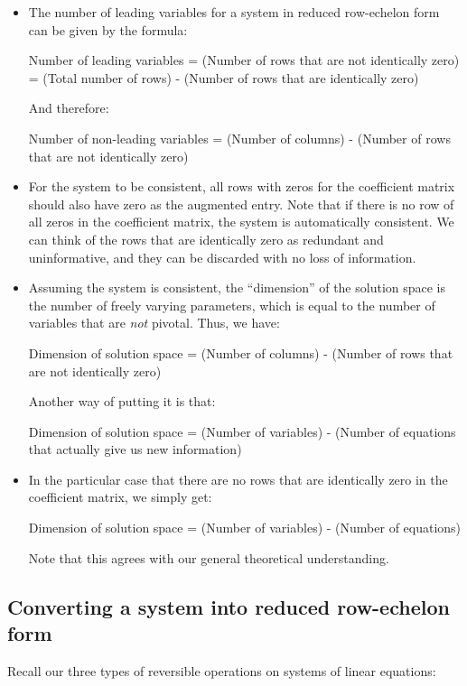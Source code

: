 \documentclass[10pt]{amsart}
\begin{document}
\begin{itemize}
\item The number of leading variables for a system in reduced
  row-echelon form can be given by the formula:

  Number of leading variables = (Number of rows that are not
  identically zero) = (Total number of rows) - (Number of rows that
  are identically zero)

  And therefore:

  Number of non-leading variables = (Number of columns) - (Number of rows that are not identically zero)

\item For the system to be consistent, all rows with zeros for the
  coefficient matrix should also have zero as the augmented
  entry. Note that if there is no row of all zeros in the coefficient
  matrix, the system is automatically consistent. We can think of the
  rows that are identically zero as redundant and uninformative, and
  they can be discarded with no loss of information.

\item Assuming the system is consistent, the ``dimension'' of the
  solution space is the number of freely varying parameters, which is
  equal to the number of variables that are {\em not} pivotal. Thus,
  we have:

  Dimension of solution space = (Number of columns) - (Number of rows
  that are not identically zero)

  Another way of putting it is that:

  Dimension of solution space = (Number of variables) - (Number of
  equations that actually give us new information)

\item In the particular case that there are no rows that are
  identically zero in the coefficient matrix, we simply get:

  Dimension of solution space = (Number of variables) - (Number of
  equations)

  Note that this agrees with our general theoretical understanding.
\end{itemize}

\subsection{Converting a system into reduced row-echelon form}

Recall our three types of reversible operations on systems of linear
equations:
\end{document}
